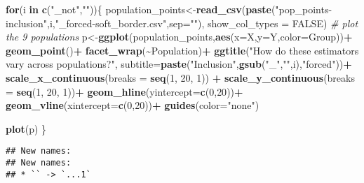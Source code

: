 \documentclass[
]{article}
\newenvironment{Shaded}{\begin{snugshade}}{\end{snugshade}}
\newcommand{\AttributeTok}[1]{\textcolor[rgb]{0.13,0.29,0.53}{#1}}
\newcommand{\CommentTok}[1]{\textcolor[rgb]{0.56,0.35,0.01}{\textit{#1}}}
\newcommand{\ConstantTok}[1]{\textcolor[rgb]{0.56,0.35,0.01}{#1}}
\newcommand{\ControlFlowTok}[1]{\textcolor[rgb]{0.13,0.29,0.53}{\textbf{#1}}}
\newcommand{\DecValTok}[1]{\textcolor[rgb]{0.00,0.00,0.81}{#1}}
\newcommand{\FunctionTok}[1]{\textcolor[rgb]{0.13,0.29,0.53}{\textbf{#1}}}
\newcommand{\NormalTok}[1]{#1}
\newcommand{\OtherTok}[1]{\textcolor[rgb]{0.56,0.35,0.01}{#1}}
\newcommand{\SpecialCharTok}[1]{\textcolor[rgb]{0.81,0.36,0.00}{\textbf{#1}}}
\newcommand{\StringTok}[1]{\textcolor[rgb]{0.31,0.60,0.02}{#1}}
\begin{document}
\begin{Shaded}
\begin{Highlighting}[]
\ControlFlowTok{for}\NormalTok{(i }\ControlFlowTok{in} \FunctionTok{c}\NormalTok{(}\StringTok{"\_not"}\NormalTok{,}\StringTok{""}\NormalTok{))\{}
\NormalTok{  population\_points}\OtherTok{\textless{}{-}}\FunctionTok{read\_csv}\NormalTok{(}\FunctionTok{paste}\NormalTok{(}\StringTok{"pop\_points{-}inclusion"}\NormalTok{,i,}\StringTok{"\_forced{-}soft\_border.csv"}\NormalTok{,}\AttributeTok{sep=}\StringTok{""}\NormalTok{),}
                      \AttributeTok{show\_col\_types =} \ConstantTok{FALSE}\NormalTok{)}
  \CommentTok{\# plot the 9 populations}
\NormalTok{  p}\OtherTok{\textless{}{-}}\FunctionTok{ggplot}\NormalTok{(population\_points,}\FunctionTok{aes}\NormalTok{(}\AttributeTok{x=}\NormalTok{X,}\AttributeTok{y=}\NormalTok{Y,}\AttributeTok{color=}\NormalTok{Group))}\SpecialCharTok{+}
    \FunctionTok{geom\_point}\NormalTok{()}\SpecialCharTok{+}
    \FunctionTok{facet\_wrap}\NormalTok{(}\SpecialCharTok{\textasciitilde{}}\NormalTok{Population)}\SpecialCharTok{+}
    \FunctionTok{ggtitle}\NormalTok{(}\StringTok{"How do these estimators vary across populations?"}\NormalTok{,}
            \AttributeTok{subtitle=}\FunctionTok{paste}\NormalTok{(}\StringTok{"Inclusion"}\NormalTok{,}\FunctionTok{gsub}\NormalTok{(}\StringTok{"\_"}\NormalTok{,}\StringTok{""}\NormalTok{,i),}\StringTok{"forced"}\NormalTok{))}\SpecialCharTok{+}
    \FunctionTok{scale\_x\_continuous}\NormalTok{(}\AttributeTok{breaks =} \FunctionTok{seq}\NormalTok{(}\DecValTok{1}\NormalTok{, }\DecValTok{20}\NormalTok{, }\DecValTok{1}\NormalTok{)) }\SpecialCharTok{+}
    \FunctionTok{scale\_y\_continuous}\NormalTok{(}\AttributeTok{breaks =} \FunctionTok{seq}\NormalTok{(}\DecValTok{1}\NormalTok{, }\DecValTok{20}\NormalTok{, }\DecValTok{1}\NormalTok{))}\SpecialCharTok{+}
    \FunctionTok{geom\_hline}\NormalTok{(}\AttributeTok{yintercept=}\FunctionTok{c}\NormalTok{(}\DecValTok{0}\NormalTok{,}\DecValTok{20}\NormalTok{))}\SpecialCharTok{+}
    \FunctionTok{geom\_vline}\NormalTok{(}\AttributeTok{xintercept=}\FunctionTok{c}\NormalTok{(}\DecValTok{0}\NormalTok{,}\DecValTok{20}\NormalTok{))}\SpecialCharTok{+}
    \FunctionTok{guides}\NormalTok{(}\AttributeTok{color=}\StringTok{"none"}\NormalTok{)}
  
  \FunctionTok{plot}\NormalTok{(p)}
\NormalTok{\}}
\end{Highlighting}
\end{Shaded}

\begin{verbatim}
## New names:
## New names:
## * `` -> `...1`
\end{verbatim}
\end{document}
